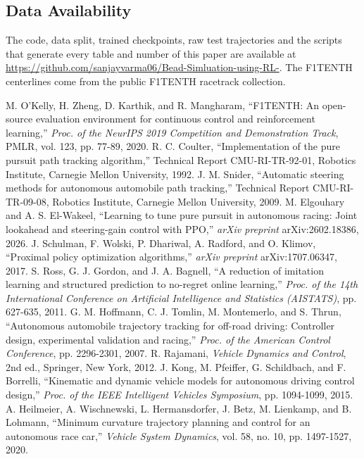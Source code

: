 \documentclass{IJCAS}
\begin{document}
\subsection*{Data Availability}
The code, data split, trained checkpoints, raw test trajectories and the scripts that generate every table and number of this paper are available at \url{https://github.com/sanjayvarma06/Bead-Simluation-using-RL-}. The F1TENTH centerlines come from the public F1TENTH racetrack collection.

\begin{reference}
 M. O'Kelly, H. Zheng, D. Karthik, and R. Mangharam, ``F1TENTH: An open-source evaluation environment for continuous control and reinforcement learning,'' \textit{Proc. of the NeurIPS 2019 Competition and Demonstration Track}, PMLR, vol. 123, pp. 77-89, 2020.
 R. C. Coulter, ``Implementation of the pure pursuit path tracking algorithm,'' Technical Report CMU-RI-TR-92-01, Robotics Institute, Carnegie Mellon University, 1992.
 J. M. Snider, ``Automatic steering methods for autonomous automobile path tracking,'' Technical Report CMU-RI-TR-09-08, Robotics Institute, Carnegie Mellon University, 2009.
 M. Elgouhary and A. S. El-Wakeel, ``Learning to tune pure pursuit in autonomous racing: Joint lookahead and steering-gain control with PPO,'' \textit{arXiv preprint} arXiv:2602.18386, 2026.
 J. Schulman, F. Wolski, P. Dhariwal, A. Radford, and O. Klimov, ``Proximal policy optimization algorithms,'' \textit{arXiv preprint} arXiv:1707.06347, 2017.
 S. Ross, G. J. Gordon, and J. A. Bagnell, ``A reduction of imitation learning and structured prediction to no-regret online learning,'' \textit{Proc. of the 14th International Conference on Artificial Intelligence and Statistics (AISTATS)}, pp. 627-635, 2011.
 G. M. Hoffmann, C. J. Tomlin, M. Montemerlo, and S. Thrun, ``Autonomous automobile trajectory tracking for off-road driving: Controller design, experimental validation and racing,'' \textit{Proc. of the American Control Conference}, pp. 2296-2301, 2007.
 R. Rajamani, \textit{Vehicle Dynamics and Control}, 2nd ed., Springer, New York, 2012.
 J. Kong, M. Pfeiffer, G. Schildbach, and F. Borrelli, ``Kinematic and dynamic vehicle models for autonomous driving control design,'' \textit{Proc. of the IEEE Intelligent Vehicles Symposium}, pp. 1094-1099, 2015.
 A. Heilmeier, A. Wischnewski, L. Hermansdorfer, J. Betz, M. Lienkamp, and B. Lohmann, ``Minimum curvature trajectory planning and control for an autonomous race car,'' \textit{Vehicle System Dynamics}, vol. 58, no. 10, pp. 1497-1527, 2020.

\end{reference}
\end{document}
